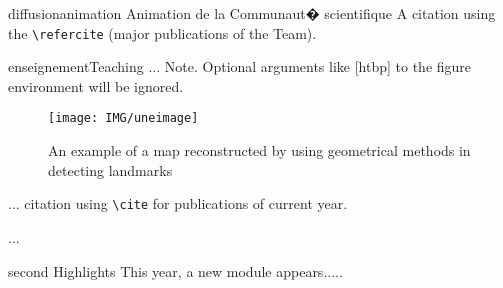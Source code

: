 \documentclass{ra2008}
\begin{document}
\begin{module}{diffusion}{animation}
  {Animation de la Communaut� scientifique}
A citation  using the \verb+\refercite+ 
(major publications of the Team).
\end{module}



\begin{module}{}{enseignement}{Teaching}
...
Note. Optional arguments like [htbp] to the figure environment will be ignored.

\begin{figure}
\begin{center}
\texttt{[image: IMG/uneimage]}
\end{center}
\caption{An example of a map reconstructed by using geometrical methods in detecting landmarks}
\label{fig:completemap}
\end{figure}
...
citation \cite{cite2} using \verb+\cite+ for publications of current year.

...
\end{module}
\begin{module}{}{second Highlights}{} %
This year, a new module appears.....
\end{module}


\end{document}
